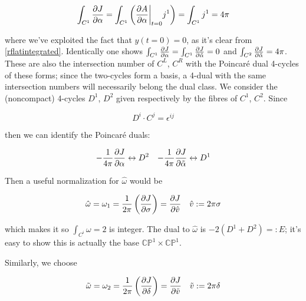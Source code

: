 \begin{equation}
	\int_{C^1} \frac{\partial J}{\partial\alpha} = \int_{C^1}\left( \frac{\partial A}{\partial\alpha}\bigg|_{t=0} j^1 \right) = \int_{C^1} j^1 = 4\pi
	\label{}
\end{equation}

where we've exploited the fact that $y(t=0) = 0$, as it's clear from \ref{rflatintegrated}. Identically one shows $\int_{C^1} \frac{\partial J}{\partial\alpha} = \int_{C^1} \frac{\partial J}{\partial\tilde\alpha} = 0$ and $\int_{C^2} \frac{\partial J}{\partial\tilde\alpha} = 4\pi$. These are also the intersection number of $C^L$, $C^R$ with the Poincar\'e dual 4-cycles of these forms; since the two-cycles form a basis, a 4-dual with the same intersection numbers will necessarily belong the dual class. We consider the (noncompact) 4-cycles $D^1$, $D^2$ given respectively by the fibres of $C^1$, $C^2$. Since

\begin{equation}
	D^i \cdot C^j = \epsilon^{ij}	
\end{equation}

then we can identify the Poincar\'e duals:

\begin{align}
	- \frac{1}{4\pi} \frac{\partial J}{\partial\alpha} \leftrightarrow D^2 && - \frac{1}{4\pi}\frac{\partial J}{\partial\tilde\alpha} \leftrightarrow D^1
	\label{}
\end{align}

Then a useful normalization for $\hat\omega$ would be

\begin{align}
	\hat\omega = \omega_1 = \frac{1}{2\pi}\left( \frac{\partial J}{\partial\sigma} \right) = \frac{\partial J}{\partial\hat v} && \hat v := 2\pi \sigma
	\label{}
\end{align}

which makes it so $\int_{C^i} \omega = 2$ is integer. The dual to $\hat \omega $ is $-2(D^1+D^2) =: E$; it's easy to show this is actually the base $\mathbb{CP}^1 \times \mathbb{CP}^1$.
%
%
%

Similarly, we choose

\begin{align}
	\tilde \omega = \omega_2 = \frac{1}{2\pi} \left( \frac{\partial J}{\partial\delta} \right) = \frac{\partial J}{\partial\tilde v} && \tilde v := 2\pi\delta
	\label{}
\end{align}

